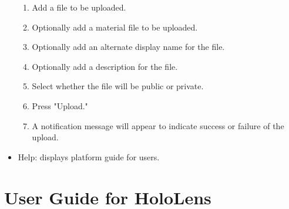 \begin{itemize}
    \begin{enumerate}
        \item Add a file to be uploaded.  
        \item Optionally add a material file to be uploaded. 
        \item Optionally add an alternate display name for the file.
        \item Optionally add a description for the file.
        \item Select whether the file will be public or private.
        \item Press "Upload."
        \item A notification message will appear to indicate success or failure of the upload. 
    \end{enumerate}
    \item Help: displays platform guide for users. 
\end{itemize}

\section{User Guide for HoloLens}

